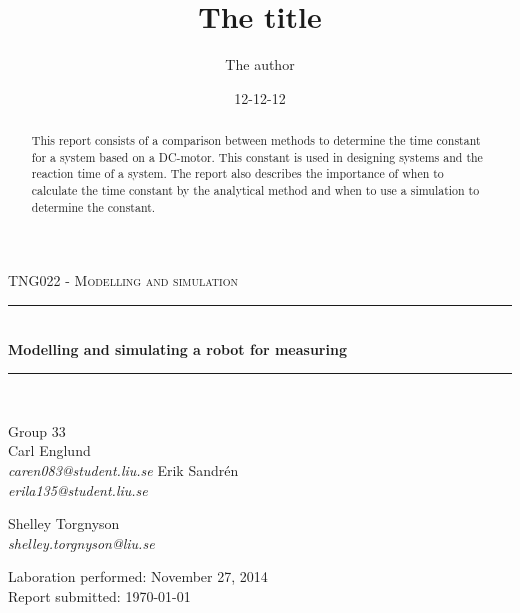 \documentclass[12pt,a4paper]{article}
\newcommand{\HRule}{\rule{\linewidth}{0.5mm}}
\begin{document}
\title{The title}
\author{The author}
\date{12-12-12}

\begin{titlepage}
\begin{center}

\textsc{TNG022 - Modelling and simulation }\\[0.5cm]

\HRule \\[0.4cm]
{ \huge \bfseries Modelling and simulating a robot for measuring \\[0.4cm] }

\HRule \\[1.5cm]

\begin{minipage}{0.4\textwidth}
\begin{flushleft} \large
Group 33\\
Carl Englund\\
\emph{caren083@student.liu.se}
Erik Sandrén\\
\emph{erila135@student.liu.se}
\end{flushleft}
\end{minipage}
\begin{minipage}{0.4\textwidth}
\begin{flushright} \large
Shelley Torgnyson\\
\emph{shelley.torgnyson@liu.se}
\end{flushright}
\end{minipage}

\vfill

{\large Laboration performed: November 27, 2014\\}
{\large Report submitted: \today}

\end{center}
\end{titlepage}

\newpage\null\thispagestyle{empty}\newpage

\newpage{} %

\begin{abstract}
This report consists of a comparison between methods to determine the time constant for a system based on a DC-motor. This constant is used in designing systems and the reaction time of a system. The report also describes the importance of when to calculate the time constant by the analytical method and when to use a simulation to determine the constant.
\end{abstract}
\end{document}
